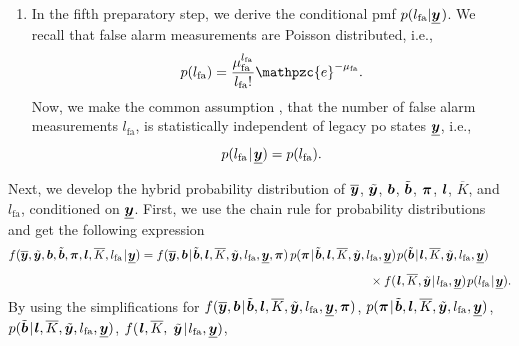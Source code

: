 \documentclass[11pt,a4paper]{article}
\newcommand{\ist}{\hspace*{.3mm}}
\newcommand{\nn}{\nonumber}
\begin{document}
\begin{enumerate}
\item In the fifth preparatory step, we derive the conditional \ac{pmf} $p(l_{\mathrm{fa}} | \underline{\V{y}}  \ist)$. We recall that false alarm measurements are Poisson distributed, \vspace{-3mm} i.e.,
\begin{equation}
p(l_{\mathrm{fa}}) = \frac{\mu^{l_{\mathrm{fa}}}_{\mathrm{fa}}}{l_{\mathrm{fa}}!} \mathpzc{e}^{-\mu_{\mathrm{fa}}}. \label{eq:condPDF5a}
\vspace{1mm}
\end{equation}
Now, we make the common assumption \cite{MeyKroWilLauHlaBraWin:J18,GraFatSve:J19}, that the number of false alarm measurements $l_{\mathrm{fa}}$, is statistically independent of legacy \ac{po} states $\underline{\bm{y}}$, i.e.,
\begin{equation}
p(l_{\mathrm{fa}} \ist | \ist \underline{\V{y}} )  = p(l_{\mathrm{fa}}).  \label{eq:condPDF5b}
\vspace{2mm}
\end{equation}

\end{enumerate}
Next, we develop the hybrid probability distribution of $\overline{\bm{y}}$, $\tilde{\bm{y}}$, $\bm{b}$, $\tilde{\bm{b}}$, $\bm{\pi}$, $\bm{l}$, $\overline{K}$, and $l_{\mathrm{fa}}$, conditioned on $\underline{\bm{y}}$. First, we use the chain rule for probability distributions and get the following expression
\begin{align}
f(\overline{\V{y}}, \tilde{\V{y}}, \V{b}, \tilde{\V{b}}, \V{\pi}, \V{l}, \overline{K}, l_{\mathrm{fa}} \ist | \ist \underline{\V{y}}) &= f(\overline{\V{y}}, \V{b} \ist | \ist \tilde{\V{b}}, \V{l}, \overline{K}, \tilde{\V{y}}, l_{\mathrm{fa}}, \underline{\V{y}}, \V{\pi} ) \ist\ist p( \V{\pi} \ist | \ist \tilde{\V{b}}, \V{l}, \overline{K}, \tilde{\V{y}},  l_{\mathrm{fa}},  \underline{\V{y}}) \ist p(\tilde{\V{b}} \ist | \ist \V{l}, \overline{K},  \tilde{\V{y}}, l_{\mathrm{fa}},  \underline{\V{y}}) \nn\\[1.5mm]
&\hspace{66.3mm} \times f( \ist \V{l}, \overline{K}, \tilde{\V{y}}  \ist | \ist l_{\mathrm{fa}}, \underline{\V{y}} )  \ist p(l_{\mathrm{fa}} \ist | \ist \underline{\V{y}} ). \label{eq:chainRule}  \\[-6mm]
\nn
\end{align}
By using the simplifications for $f(\overline{\V{y}}, \V{b} \ist | \ist \tilde{\V{b}}, \V{l}, \overline{K}, \tilde{\V{y}}, l_{\mathrm{fa}}, \underline{\V{y}}, \V{\pi} )$, $p( \V{\pi} \ist | \ist \tilde{\V{b}}, \V{l}, \overline{K}, \tilde{\V{y}},  l_{\mathrm{fa}},  \underline{\V{y}})$, $p(\tilde{\V{b}} \ist | \ist \V{l}, \overline{K},  \tilde{\V{y}}, l_{\mathrm{fa}},  \underline{\V{y}}) $, $f( \ist \V{l}, \overline{K},$ $\tilde{\V{y}}  \ist | \ist l_{\mathrm{fa}}, \underline{\V{y}} )$, 
\end{document}
